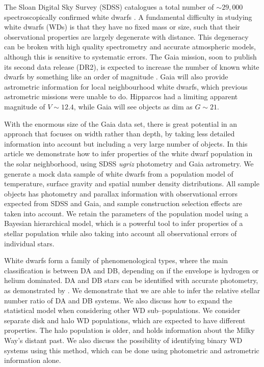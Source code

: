 \documentclass[fleqn,usenatbib]{mnras}
\begin{document}
The Sloan Digital Sky Survey (SDSS) catalogues a total number of $\sim 29,000$ spectroscopically confirmed white dwarfs \citep{2013ApJS..204....5K,2015MNRAS.446.4078K}. A fundamental difficulty in studying white dwarfs (WDs) is that they have no fixed mass or size, such that their observational properties are largely degenerate with distance. This degeneracy can be broken with high quality spectrometry and accurate atmospheric models, although this is sensitive to systematic errors. The Gaia mission, soon to publish its second data release (DR2), is expected to increase the number of known white dwarfs by something like an order of magnitude \citep{2014A&A...565A..11C,Jordan:2006jg}. Gaia will also provide astrometric information for local neighbourhood white dwarfs, which previous astrometric missions were unable to do. Hipparcos had a limiting apparent magnitude of $V \sim 12.4$, while Gaia will see objects as dim as $G \sim 21$.

With the enormous size of the Gaia data set, there is great potential in an approach that focuses on width rather than depth, by taking less detailed information into account but including a very large number of objects. In this article we demonstrate how to infer properties of the white dwarf population in the solar neighborhood, using SDSS \emph{ugriz} photometry and Gaia astrometry. We generate a mock data sample of white dwarfs from a population model of temperature, surface gravity and spatial number density distributions. All sample objects has photometry and parallax information with observational errors expected from SDSS and Gaia, and sample construction selection effects are taken into account. We retain the parameters of the population model using a Bayesian hierarchical model, which is a powerful tool to infer properties of a stellar population while also taking into account all observational errors of individual stars.

White dwarfs form a family of phenomenological types, where the main classification is between DA and DB, depending on if the envelope is hydrogen or helium dominated. DA and DB stars can be identified with accurate photometry, as demonstrated by \cite{Mortlock:2008gf}. We demonstrate that we are able to infer the relative stellar number ratio of DA and DB systems. We also discuss how to expand the statistical model when considering other WD sub--populations. We consider separate disk and halo WD populations, which are expected to have different properties. The halo population is older, and holds information about the Milky Way's distant past. We also discuss the possibility of identifying binary WD systems using this method, which can be done using photometric and astrometric information alone.
\end{document}
